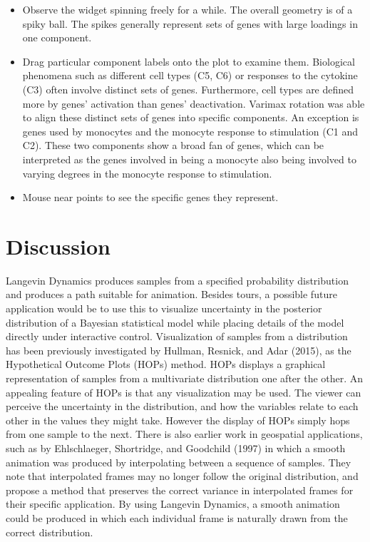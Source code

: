 \begin{itemize}
\item
  Observe the widget spinning freely for a while. The overall geometry is of a spiky ball. The spikes generally represent sets of genes with large loadings in one component.
\item
  Drag particular component labels onto the plot to examine them. Biological phenomena such as different cell types (C5, C6) or responses to the cytokine (C3)
  often involve distinct sets of genes. Furthermore, cell types are defined more by genes' activation than genes' deactivation. Varimax rotation was able to align these distinct sets of genes into specific components. An exception is genes used by monocytes and the monocyte response to stimulation (C1 and C2). These two components show a broad fan of genes, which can be interpreted as the genes involved in being a monocyte also being involved to varying degrees in the monocyte response to stimulation.
\item
  Mouse near points to see the specific genes they represent.
\end{itemize}

\hypertarget{discussion}{%
\section{Discussion}\label{discussion}}

Langevin Dynamics produces samples from a specified probability distribution and produces a path suitable for animation. Besides tours, a possible future application would be to use this to visualize uncertainty in the posterior distribution of a Bayesian statistical model while placing details of the model directly under interactive control. Visualization of samples from a distribution has been previously investigated by Hullman, Resnick, and Adar (2015), as the Hypothetical Outcome Plots (HOPs) method. HOPs displays a graphical representation of samples from a multivariate distribution one after the other. An appealing feature of HOPs is that any visualization may be used. The viewer can perceive the uncertainty in the distribution, and how the variables relate to each other in the values they might take. However the display of HOPs simply hops from one sample to the next. There is also earlier work in geospatial applications, such as by Ehlschlaeger, Shortridge, and Goodchild (1997) in which a smooth animation was produced by interpolating between a sequence of samples. They note that interpolated frames may no longer follow the original distribution, and propose a method that preserves the correct variance in interpolated frames for their specific application. By using Langevin Dynamics, a smooth animation could be produced in which each individual frame is naturally drawn from the correct distribution.

